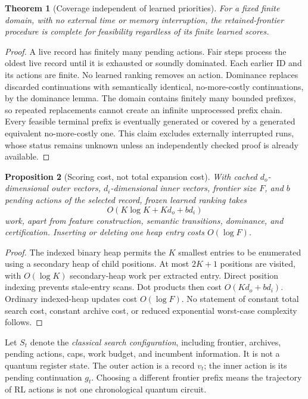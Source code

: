 \documentclass[11pt]{article}
\newtheorem{theorem}{Theorem}
\newtheorem{proposition}[theorem]{Proposition}
\theoremstyle{definition}\newtheorem{definition}[theorem]{Definition}
\begin{document}
\begin{theorem}[Coverage independent of learned priorities]
For a fixed finite domain, with no external time or memory interruption, the retained-frontier procedure is complete for feasibility regardless of its finite learned scores.
\end{theorem}
\begin{proof}
A live record has finitely many pending actions. Fair steps process the oldest live record until it is exhausted or soundly dominated. Each earlier ID and its actions are finite. No learned ranking removes an action. Dominance replaces discarded continuations with semantically identical, no-more-costly continuations, by the dominance lemma. The domain contains finitely many bounded prefixes, so repeated replacements cannot create an infinite unprocessed prefix chain. Every feasible terminal prefix is eventually generated or covered by a generated equivalent no-more-costly one. This claim excludes externally interrupted runs, whose status remains unknown unless an independently checked proof is already available.
\end{proof}

\begin{proposition}[Scoring cost, not total expansion cost]
With cached $d_o$-dimensional outer vectors, $d_i$-dimensional inner vectors, frontier size $F$, and $b$ pending actions of the selected record, frozen learned ranking takes
\begin{equation}
O(K\log K+Kd_o+bd_i)
\label{eq:scoring}
\end{equation}
work, apart from feature construction, semantic transitions, dominance, and certification. Inserting or deleting one heap entry costs $O(\log F)$.
\end{proposition}
\begin{proof}
The indexed binary heap permits the $K$ smallest entries to be enumerated using a secondary heap of child positions. At most $2K+1$ positions are visited, with $O(\log K)$ secondary-heap work per extracted entry. Direct position indexing prevents stale-entry scans. Dot products then cost $O(Kd_o+bd_i)$. Ordinary indexed-heap updates cost $O(\log F)$. No statement of constant total search cost, constant archive cost, or reduced exponential worst-case complexity follows.
\end{proof}

Let $S_t$ denote the \emph{classical search configuration}, including frontier, archives, pending actions, caps, work budget, and incumbent information. It is not a quantum register state. The outer action is a record $v_t$; the inner action is its pending continuation $g_t$. Choosing a different frontier prefix means the trajectory of RL actions is not one chronological quantum circuit.
\end{document}
